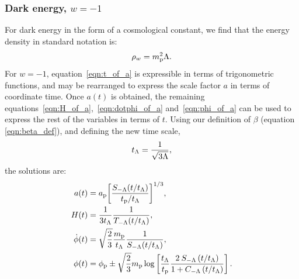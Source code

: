 \subsubsection{Dark energy, \(w=-1\)}
For dark energy in the form of a cosmological constant, we find that the energy density in standard notation is:
\begin{equation}
  \rho_w = m_{\mathrm{p}}^2\Lambda.
\end{equation}
For \(w=-1\), equation~\eqref{eqn:t_of_a} is expressible in terms of trigonometric functions, and may be rearranged to express the scale factor \(a\) in terms of coordinate time. Once \(a(t)\) is obtained, the remaining equations~\eqref{eqn:H_of_a},~\eqref{eqn:dotphi_of_a} and~\eqref{eqn:phi_of_a} can be used to express the rest of the variables in terms of \(t\). Using our definition of \(\beta\) (equation \nolinebreak\ref{eqn:beta_def}), and defining the new time scale,
\begin{equation}
  t_\mathrm{\Lambda} = \frac{1}{\sqrt{3\Lambda}},
  \label{eqn:tl}
\end{equation}
the solutions are:
\begin{align}
  a(t)
  &=
  a_{\mathrm{p}}{\left[{\frac {S_{-\Lambda}(t/t_\mathrm{\Lambda})}{t_{\mathrm{p}}/t_\mathrm{\Lambda}}}\right]}^{1/3},
  \\
  H(t)
  &=
  \frac{1}{3t_\mathrm{\Lambda}}\frac{1}{T_{-\Lambda}(t/t_\mathrm{\Lambda})},
  \\
  \dot{\phi}(t)
  &=
  \sqrt{\frac{2}{3}}\frac{m_{\mathrm{p}}}{t_\mathrm{\Lambda}}\frac{1}{S_{-\Lambda}(t/t_\mathrm{\Lambda})},
  \\
  \phi(t)
  &=
  \phi_{\mathrm{p}} \pm \sqrt{\frac{2}{3}}m_{\mathrm{p}}
  \log\left[
  \frac{t_\mathrm{\Lambda}}{t_{\mathrm{p}}} 
  \frac 
  {2\: S_{-\Lambda} \left( t/t_\mathrm{\Lambda} \right) }
  {1 + C_{-\Lambda} \left( t/t_\mathrm{\Lambda} \right)}  
  \right].
\end{align}

